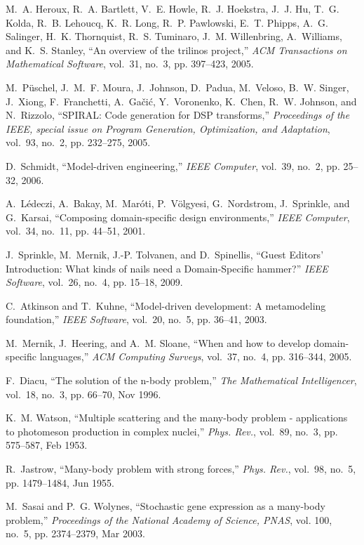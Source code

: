 \documentclass[draftclsnofoot]{elsarticle}
\begin{document}
\begin{thebibliography}{10}
M.~A. Heroux, R.~A. Bartlett, V.~E. Howle, R.~J. Hoekstra, J.~J. Hu, T.~G.
  Kolda, R.~B. Lehoucq, K.~R. Long, R.~P. Pawlowski, E.~T. Phipps, A.~G.
  Salinger, H.~K. Thornquist, R.~S. Tuminaro, J.~M. Willenbring, A.~Williams,
  and K.~S. Stanley, ``An overview of the trilinos project,'' \emph{ACM
  Transactions on Mathematical Software}, vol.~31, no.~3, pp. 397--423, 2005.

M.~P{\"u}schel, J.~M.~F. Moura, J.~Johnson, D.~Padua, M.~Veloso, B.~W. Singer,
  J.~Xiong, F.~Franchetti, A.~Ga\v{c}i\'{c}, Y.~Voronenko, K.~Chen, R.~W.
  Johnson, and N.~Rizzolo, ``{SPIRAL}: Code generation for {DSP} transforms,''
  \emph{Proceedings of the IEEE, special issue on Program Generation,
  Optimization, and Adaptation}, vol.~93, no.~2, pp. 232--275, 2005.

D.~Schmidt, ``Model-driven engineering,'' \emph{IEEE Computer}, vol.~39, no.~2,
  pp. 25--32, 2006.

A.~L\'{e}deczi, A.~Bakay, M.~Mar\'{o}ti, P.~V\"{o}lgyesi, G.~Nordstrom,
  J.~Sprinkle, and G.~Karsai, ``Composing domain-specific design
  environments,'' \emph{IEEE Computer}, vol.~34, no.~11, pp. 44--51, 2001.

J.~Sprinkle, M.~Mernik, J.-P. Tolvanen, and D.~Spinellis, ``{Guest Editors'
  Introduction}: {W}hat kinds of nails need a {D}omain-{S}pecific hammer?''
  \emph{IEEE Software}, vol.~26, no.~4, pp. 15--18, 2009.

C.~Atkinson and T.~Kuhne, ``Model-driven development: {A} metamodeling
  foundation,'' \emph{IEEE Software}, vol.~20, no.~5, pp. 36--41, 2003.

M.~Mernik, J.~Heering, and A.~M. Sloane, ``When and how to develop
  domain-specific languages,'' \emph{ACM Computing Surveys}, vol.~37, no.~4,
  pp. 316--344, 2005.

F.~Diacu, ``The solution of the n-body problem,'' \emph{The Mathematical
  Intelligencer}, vol.~18, no.~3, pp. 66--70, Nov 1996.

K.~M. Watson, ``Multiple scattering and the many-body problem - applications to
  photomeson production in complex nuclei,'' \emph{Phys. Rev.}, vol.~89, no.~3,
  pp. 575--587, Feb 1953.

R.~Jastrow, ``Many-body problem with strong forces,'' \emph{Phys. Rev.},
  vol.~98, no.~5, pp. 1479--1484, Jun 1955.

M.~Sasai and P.~G. Wolynes, ``Stochastic gene expression as a many-body
  problem,'' \emph{Proceedings of the National Academy of Science, PNAS}, vol.
  100, no.~5, pp. 2374--2379, Mar 2003.


\end{thebibliography}
\end{document}
